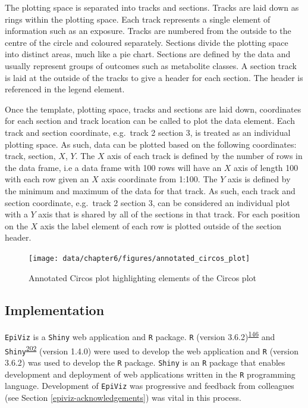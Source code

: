 \documentclass[11pt,twoside]{bristolthesis}
\begin{document}
The plotting space is separated into tracks and sections. Tracks are laid down as rings within the plotting space. Each track represents a single element of information such as an exposure. Tracks are numbered from the outside to the centre of the circle and coloured separately. Sections divide the plotting space into distinct areas, much like a pie chart. Sections are defined by the data and usually represent groups of outcomes such as metabolite classes. A section track is laid at the outside of the tracks to give a header for each section. The header is referenced in the legend element.

Once the template, plotting space, tracks and sections are laid down, coordinates for each section and track location can be called to plot the data element. Each track and section coordinate, e.g.~track 2 section 3, is treated as an individual plotting space. As such, data can be plotted based on the following coordinates: track, section, \(X\), \(Y\). The \(X\) axis of each track is defined by the number of rows in the data frame, i.e a data frame with 100 rows will have an \(X\) axis of length 100 with each row given an \(X\) axis coordinate from 1:100. The \(Y\) axis is defined by the minimum and maximum of the data for that track. As such, each track and section coordinate, e.g.~track 2 section 3, can be considered an individual plot with a \(Y\) axis that is shared by all of the sections in that track. For each position on the \(X\) axis the label element of each row is plotted outside of the section header.
\begin{figure}
\texttt{[image: data/chapter6/figures/annotated\_circos\_plot]} \caption{Annotated Circos plot highlighting elements of the Circos plot}\label{fig:annotated-circos-plot}
\end{figure}
\hypertarget{implementation}{%
\subsection{Implementation}\label{implementation}}

\texttt{EpiViz} is a \texttt{Shiny} web application and \texttt{R} package. \texttt{R} (version 3.6.2)\textsuperscript{\protect\hyperlink{ref-r2019}{146}} and \texttt{Shiny}\textsuperscript{\protect\hyperlink{ref-Chang2019}{202}} (version 1.4.0) were used to develop the web application and \texttt{R} (version 3.6.2) was used to develop the \texttt{R} package. \texttt{Shiny} is an \texttt{R} package that enables development and deployment of web applications written in the \texttt{R} programming language. Development of \texttt{EpiViz} was progressive and feedback from colleagues (see Section \ref{epiviz-acknowledgements}) was vital in this process.
\end{document}
